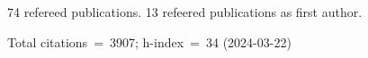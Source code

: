 74 refereed publications. 13 refeered publications as first author.

Total citations~=~3907; h-index~=~34 (2024-03-22)